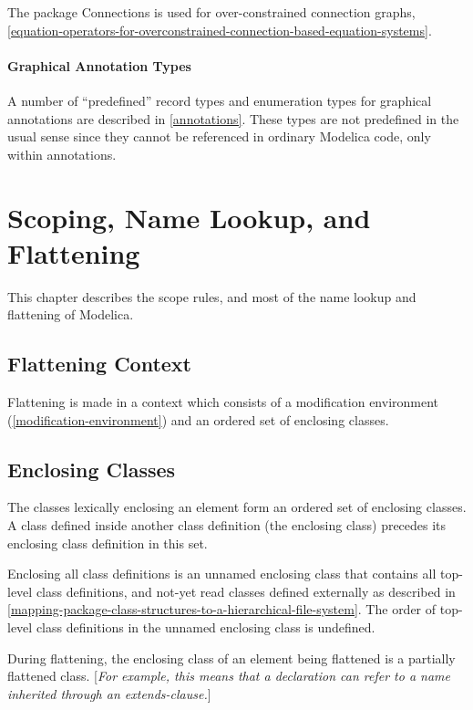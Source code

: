 \documentclass[10pt,a4paper]{report}
\def\doublelabel#1{\label{#1}\hypertarget{#1}{}}
\begin{document}
The package Connections is used for over-constrained connection graphs,
\ref{equation-operators-for-overconstrained-connection-based-equation-systems}.

\subsubsection{Graphical Annotation Types}\doublelabel{graphical-annotation-types}

A number of ``predefined'' record types and enumeration types for
graphical annotations are described in \ref{annotations}. These types are not
predefined in the usual sense since they cannot be referenced in
ordinary Modelica code, only within annotations.

\chapter{Scoping, Name Lookup, and Flattening}\doublelabel{scoping-name-lookup-and-flattening}

This chapter describes the scope rules, and most of the name lookup and
flattening of Modelica.

\section{Flattening Context}\doublelabel{flattening-context}

Flattening is made in a context which consists of a modification
environment (\ref{modification-environment}) and an ordered set of enclosing classes.

\section{Enclosing Classes}\doublelabel{enclosing-classes}

The classes lexically enclosing an element form an ordered set of
enclosing classes. A class defined inside another class definition (the
enclosing class) precedes its enclosing class definition in this set.

Enclosing all class definitions is an unnamed enclosing class that
contains all top-level class definitions, and not-yet read classes
defined externally as described in \ref{mapping-package-class-structures-to-a-hierarchical-file-system}. The order of
top-level class definitions in the unnamed enclosing class is undefined.

During flattening, the enclosing class of an element being flattened is
a partially flattened class. {[}\emph{For example, this means that a
declaration can refer to a name inherited through an extends-clause.}{]}
\end{document}
